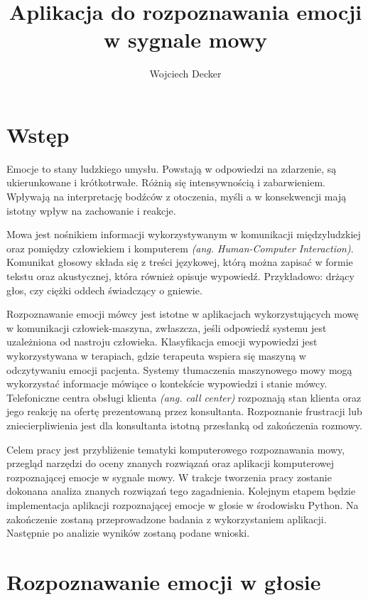\documentclass[a4paper,12pt,twoside,openany]{report}
\title{Aplikacja do rozpoznawania emocji w sygnale mowy}
\author{Wojciech Decker}
\newcommand*\NewPage{\newpage\null\thispagestyle{empty}\newpage}
\newcommand{\ang}[1]{\textit{(ang. #1)}}
\begin{document}
\maketitle
\chapter{Wstęp}
\label{ch:wstep}
Emocje to stany ludzkiego umysłu.
Powstają w odpowiedzi na zdarzenie, są ukierunkowane i krótkotrwałe.
Różnią się intensywnością i zabarwieniem.
Wpływają na interpretację bodźców z otoczenia,
myśli a w konsekwencji mają istotny wpływ na zachowanie i reakcje.

Mowa jest nośnikiem informacji wykorzystywanym w komunikacji międzyludzkiej
oraz pomiędzy człowiekiem i komputerem \- \ang{Human-Computer Interaction}.
Komunikat głosowy składa się z treści językowej,
którą można zapisać w formie tekstu
oraz akustycznej, która również opisuje wypowiedź. Przykładowo:
drżący głos, czy ciężki oddech świadczący o gniewie.

Rozpoznawanie emocji mówcy jest istotne w aplikacjach wykorzystujących mowę w komunikacji człowiek-maszyna,
zwłaszcza, jeśli odpowiedź systemu jest uzależniona od nastroju człowieka.
Klasyfikacja emocji wypowiedzi jest wykorzystywana w terapiach,
gdzie terapeuta wspiera się maszyną w odczytywaniu emocji pacjenta.
Systemy tłumaczenia maszynowego mowy mogą wykorzystać informacje mówiące o kontekście wypowiedzi i stanie mówcy.
Telefoniczne centra obsługi klienta \ang{call center} rozpoznają stan klienta
oraz jego reakcję na ofertę prezentowaną przez konsultanta.
Rozpoznanie frustracji lub zniecierpliwienia jest dla konsultanta istotną przesłanką od zakończenia rozmowy.

Celem pracy jest przybliżenie tematyki komputerowego rozpoznawania mowy,
przegląd narzędzi do oceny znanych rozwiązań oraz aplikacji komputerowej rozpoznającej emocje w sygnale mowy.
W trakcje tworzenia pracy zostanie dokonana analiza znanych rozwiązań tego zagadnienia.
Kolejnym etapem będzie implementacja aplikacji rozpoznającej emocje w głosie w środowisku Python.
Na zakończenie zostaną przeprowadzone badania z wykorzystaniem aplikacji.
Następnie po analizie wyników zostaną podane wnioski.

\NewPage
\chapter{Rozpoznawanie emocji w głosie}
\end{document}
